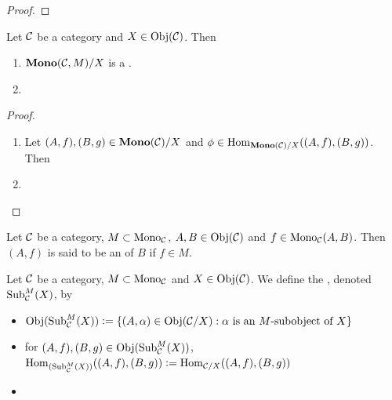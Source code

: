 \documentclass{book}
\begin{document}
	\begin{proof}
		 
	\end{proof}
	
	\begin{ex}
		Let $\mathcal{C}$ be a category and $X \in \operatorname{Obj}(\mathcal{C})$. Then 
		\begin{enumerate}
			\item $\operatorname{\textbf{Mono}}(\mathcal{C}, M) / X$ is a .
			\item 
		\end{enumerate}
	\end{ex}
	
	\begin{proof}
		\begin{enumerate}
			\item Let $(A, f), (B, g) \in \operatorname{\textbf{Mono}}(\mathcal{C}) / X$ and $\phi \in \operatorname{Hom}_{\operatorname{\textbf{Mono}}(\mathcal{C}) / X}((A,f), (B,g))$. Then  
			\item 
		\end{enumerate}
	\end{proof}
	
	
	
	
	
	
	
	
	
	
	
	
	
	\begin{defn}
		Let $\mathcal{C}$ be a category, $M \subset \operatorname{Mono}_{\mathcal{C}}$, $A, B \in \operatorname{Obj}(\mathcal{C})$ and $f \in \operatorname{Mono}_{\mathcal{C}}(A,B)$. Then $(A, f)$ is said to be an  of $B$ if $f \in M$.
	\end{defn}
	
	\begin{defn}
		Let $\mathcal{C}$ be a category, $M \subset \operatorname{Mono}_{\mathcal{C}}$ and $X \in \operatorname{Obj}(\mathcal{C})$. We define the , denoted $\operatorname{Sub}^M_{\mathcal{C}}(X)$, by 
		\begin{itemize}
			\item $\operatorname{Obj}(\operatorname{Sub}^M_{\mathcal{C}}(X)) \vcentcolon= \{(A, \alpha) \in \operatorname{Obj}(\mathcal{C}/X): \text{$\alpha$ is an $M$-subobject of $X$}\}$
			\item for $(A,f), (B,g) \in \operatorname{Obj}(\operatorname{Sub}_{\mathcal{C}}^M(X))$, $\operatorname{Hom}_{(\operatorname{Sub}_{\mathcal{C}}^M(X))}((A,f), (B,g)) \vcentcolon= \operatorname{Hom}_{\mathcal{C}/X}((A,f), (B,g))$
			\item 
		\end{itemize}
	\end{defn}
	
	
	
\end{document}
